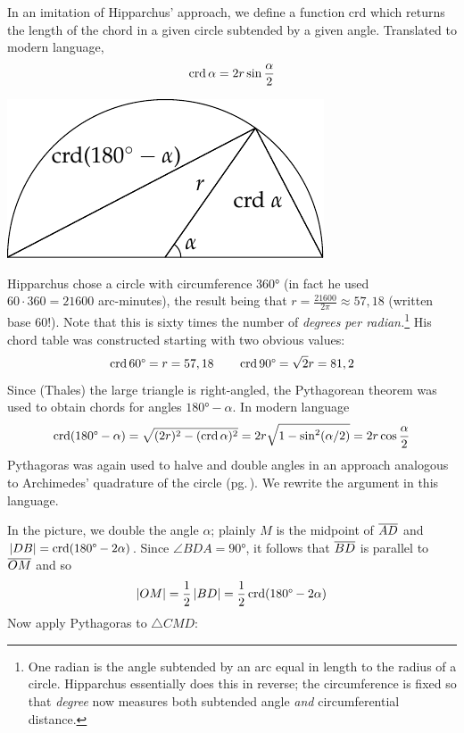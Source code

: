 \begin{minipage}[t]{0.63\linewidth}\vspace{0pt}
	In an imitation of Hipparchus' approach, we define a function crd which returns the length of the chord in a given circle subtended by a given angle. Translated to modern language,
	\[
		\crd\alpha=2r\sin\frac\alpha 2
	\]
\end{minipage}
\hfill
\begin{minipage}[t]{0.36\linewidth}\vspace{-10pt}
	\flushright\includegraphics[scale=0.95]{trig-chord}
\end{minipage}\medbreak
Hipparchus chose a circle with circumference \ang{360} (in fact he used $60\cdot 360=21600$ arc-minutes), the result being that $r=\frac{21600}{2\pi}\approx 57,18$ (written base 60!). Note that this is sixty times the number of \emph{degrees per radian.}\footnote{One radian is the angle subtended by an arc equal in length to the radius of a circle. Hipparchus essentially does this in reverse; the circumference is fixed so that \emph{degree} now measures both subtended angle \emph{and} circumferential distance.} His chord table was constructed starting with two obvious values:
\[
	\crd \ang{60}=r=57,18\qquad \crd \ang{90}=\sqrt 2r=81,2
\]
Since (Thales) the large triangle is right-angled, the Pythagorean theorem was used to obtain chords for angles $\ang{180}-\alpha$. In modern language
\[
	\crd(\ang{180}-\alpha) =\sqrt{(2r)^2-(\crd\alpha)^2} =2r\sqrt{1-\sin^2(\alpha/2)} =2r\cos\frac\alpha 2
	\]
Pythagoras was again used to halve and double angles in an approach analogous to Archimedes' quadrature of the circle (pg.\,\pageref{pg:archquadcircle}). We rewrite the argument in this language.\par
\begin{minipage}[t]{0.6\linewidth}\vspace{0pt}
	In the picture, we double the angle $\alpha$; plainly $M$ is the midpoint of $\cl{AD}$ and $\nm{DB}=\crd(\ang{180}-2\alpha)$. Since $\angle BDA=\ang{90}$, it follows that $\cl{BD}$ is parallel to $\cl{OM}$ and so
	\[
		\nm{OM}=\frac 12\nm{BD}=\frac 12\crd(\ang{180}-2\alpha)
	\]
	Now apply Pythagoras to $\triangle CMD$:
\end{minipage}
